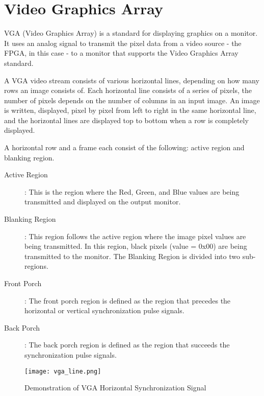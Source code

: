 \section{Video Graphics Array}
\par VGA (Video Graphics Array) is a standard for displaying graphics on a monitor. It uses an analog signal to transmit the pixel data from a video source - the FPGA, in this case - to a monitor that supports the Video Graphics Array standard. \newline
\par A VGA video stream consists of various horizontal lines, depending on how many rows an image consists of. Each horizontal line consists of a series of pixels, the number of pixels depends on the number of columns in an input image. An image is written, displayed, pixel by pixel from left to right in the same horizontal line, and the horizontal lines are displayed top to bottom when a row is completely displayed. \newline
\par A horizontal row and a frame each consist of the following: active region and blanking region. 
\begin{description}
    \item[Active Region]: This is the region where the Red, Green, and Blue values are being transmitted and displayed on the output monitor.  
    \item[Blanking Region]: This region follows the active region where the image pixel values are being transmitted. In this region, black pixels (value = 0x00) are being transmitted to the monitor. The Blanking Region is divided into two sub-regions. 
\end{description}
\begin{description}
	\item[Front Porch]: The front porch region is defined as the region that precedes the horizontal or vertical synchronization pulse signals.
	\item[Back Porch]: The back porch region is defined as the region that succeeds the synchronization pulse signals.
\end{description}

\begin{figure}[H]
    \centering
    \texttt{[image: vga\_line.png]}
    \caption{Demonstration of VGA Horizontal Synchronization Signal \cite{figeight}}
    \label{fig:vgasignals}  
\end{figure}

